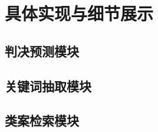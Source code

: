 \chapter{具体实现与细节展示}
\label{cha:algorithm}

\section{判决预测模块}


\section{关键词抽取模块}


\section{类案检索模块}


